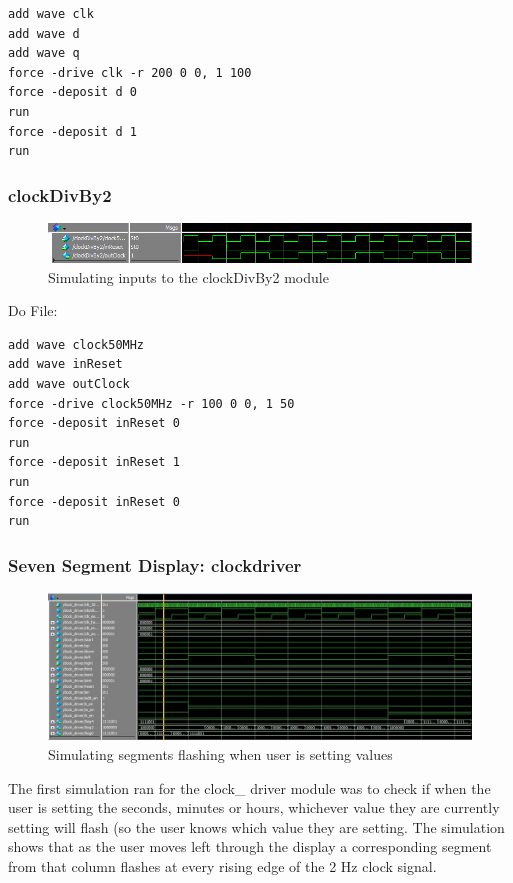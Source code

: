 \documentclass[a4paper]{article}
\begin{document}
\begin{Verbatim}
add wave clk
add wave d
add wave q
force -drive clk -r 200 0 0, 1 100
force -deposit d 0
run
force -deposit d 1
run
\end{Verbatim}

\subsubsection{clockDivBy2}

\begin{figure}[H]
    \includegraphics[width=0.8 \linewidth]{images/clockDivBy2Sim.png}
    \caption{Simulating inputs to the clockDivBy2 module}
    \label{clockDivBy2Sim}
\end{figure}

Do File:

\begin{Verbatim}
add wave clock50MHz
add wave inReset
add wave outClock
force -drive clock50MHz -r 100 0 0, 1 50
force -deposit inReset 0
run
force -deposit inReset 1
run
force -deposit inReset 0
run
\end{Verbatim}

\subsubsection{Seven Segment Display: clockdriver}

\begin{figure}[H]
    \includegraphics[width=0.8 \linewidth]{images/clockdriversim1.JPG}
    \caption{Simulating segments flashing when user is setting values}
    \label{clockdriversim1}
\end{figure}
The first simulation ran for the clock\_ driver module was to check if when the user is setting the seconds, minutes or hours, whichever value they are currently setting will flash (so the user knows which value they are setting. The simulation shows that as the user moves left through the display a corresponding segment from that column flashes at every rising edge of the 2 Hz clock signal.
\end{document}
